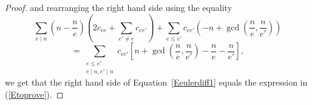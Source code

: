 \documentclass[12pt]{amsart}
\numberwithin{equation}{section}
\theoremstyle{definition}
\newcommand{\padma}[1]{{\color{Magenta} \sf $\clubsuit\clubsuit\clubsuit$ Padma: [#1]}}
\DeclareMathOperator{\cha}{char}
\begin{document}
\begin{proof}
and rearranging the right hand side using the equality 
\[\sum_{e \mid n} \left(n - \frac{n}{e}\right) \left(2c_{ee} + \sum_{e' \neq e} c_{ee'} \right) + \sum_{e \leq e'} c_{ee'} \left( -n+\gcd \left(\frac{n}{e},\frac{n}{e'} \right) \right) \] \[= \sum_{\substack{e \leq e' \\ e \mid n, e' \mid n}} c_{ee'} \left[ n+\gcd \left(\frac{n}{e},\frac{n}{e'} \right)-\frac{n}{e}-\frac{n}{e'} \right], \]
we get that the right hand side of Equation~\eqref{Eeulerdiff1} equals the expression in (\ref{Etoprove}).\qedhere


\end{proof}
\end{document}
